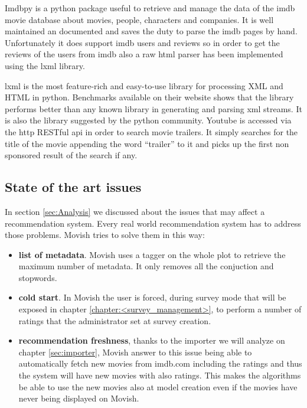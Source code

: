 Imdbpy is a python package useful to retrieve and manage the data of the imdb movie database about movies, people, characters and companies. It is well maintained an documented and saves the duty to parse the imdb pages by hand. Unfortunately it does support imdb users and reviews so in order to get the reviews of the users from imdb also a raw html parser has been implemented using the lxml library.

lxml is the most feature-rich and easy-to-use library for processing XML and HTML in python. Benchmarks available on their website shows that the library performs better than any known library in generating and parsing xml streams. It is also the library suggested by the python community.
Youtube is accessed via the http RESTful api in order to search movie trailers. It simply searches for the title of the movie appending the word ``trailer'' to it and picks up the first non sponsored result of the search if any.

\subsection{State of the art issues}
\label{sec:state_of_the_art_issues}

In section \ref{sec:Analysis} we discussed about the issues that may affect a recommendation system. Every real world recommendation system has to address those problems. Movish tries to solve them in this way:

\begin{itemize}
\item \textbf{list of metadata}. Movish uses a tagger on the whole plot to retrieve the maximum number of metadata. It only removes all the conjuction and stopwords.
\item \textbf{cold start}. In Movish the user is forced, during survey mode that will be exposed in chapter \ref{chapter:<survey_management>}, to perform a number of ratings that the administrator set at survey creation.
\item \textbf{recommendation freshness}, thanks to the importer we will analyze on chapter \ref{sec:importer}, Movish answer to this issue being able to automatically fetch new movies from imdb.com including the ratings and thus the system will have new movies with also ratings. This makes the algorithms be able to use the new movies also at model creation even if the movies have never being displayed on Movish.
\end{itemize}

